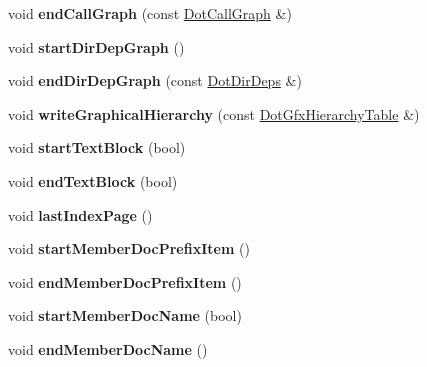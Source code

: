\begin{DoxyCompactItemize}
void {\bfseries end\+Call\+Graph} (const \mbox{\hyperlink{class_dot_call_graph}{Dot\+Call\+Graph}} \&)
\item 
\mbox{\label{class_man_generator_a6b4472b2eefeb5376c745f25bf4f0311}} 
void {\bfseries start\+Dir\+Dep\+Graph} ()
\item 
\mbox{\label{class_man_generator_a8b3fafcb2963a874643dcacbc378a58f}} 
void {\bfseries end\+Dir\+Dep\+Graph} (const \mbox{\hyperlink{class_dot_dir_deps}{Dot\+Dir\+Deps}} \&)
\item 
\mbox{\label{class_man_generator_a29e42193144cbcafd32527f0bf85c7e3}} 
void {\bfseries write\+Graphical\+Hierarchy} (const \mbox{\hyperlink{class_dot_gfx_hierarchy_table}{Dot\+Gfx\+Hierarchy\+Table}} \&)
\item 
\mbox{\label{class_man_generator_a920fb8d9e9cdcc0959069d9f0f7a4ff4}} 
void {\bfseries start\+Text\+Block} (bool)
\item 
\mbox{\label{class_man_generator_ae9eec8226a8e5cdf4e1f39a540bc104a}} 
void {\bfseries end\+Text\+Block} (bool)
\item 
\mbox{\label{class_man_generator_a20a2522333b26065dd45251026189ba0}} 
void {\bfseries last\+Index\+Page} ()
\item 
\mbox{\label{class_man_generator_a4528a4f96f3c5c490534fa5df750bace}} 
void {\bfseries start\+Member\+Doc\+Prefix\+Item} ()
\item 
\mbox{\label{class_man_generator_a477bbfac640dbc619568ac3a097b3e4e}} 
void {\bfseries end\+Member\+Doc\+Prefix\+Item} ()
\item 
\mbox{\label{class_man_generator_a3620ad41b729c1de0d0b96c730048c50}} 
void {\bfseries start\+Member\+Doc\+Name} (bool)
\item 
\mbox{\label{class_man_generator_af1309137ca207483ff87c122694f83ce}} 
void {\bfseries end\+Member\+Doc\+Name} ()
\item 
\mbox{\label{class_man_generator_a113e5a32a7a3bc816a3348956a41113e}} 

\end{DoxyCompactItemize}

